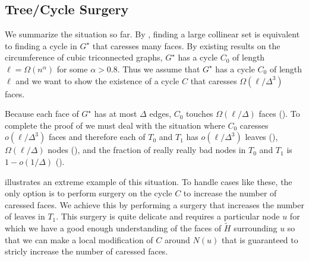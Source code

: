 \documentclass{patmorin}
\newcommand{\dual}[1]{{#1}^\star}
\begin{document}
%


\subsection{Tree/Cycle Surgery}

We summarize the situation so far.  By , finding a large collinear set is equivalent to finding a cycle in $\dual{G}$ that caresses many faces.  By existing results on the circumference of cubic triconnected graphs, $\dual{G}$ has a cycle $C_0$ of length $\ell=\Omega(n^{\alpha})$ for some $\alpha > 0.8$.  Thus we assume that $\dual{G}$ has a cycle $C_0$ of length $\ell$ and we want to show the existence of a cycle $C$ that caresses $\Omega(\ell/\Delta^3)$ faces.

Because each face of $\dual{G}$ has at most $\Delta$ edges, $C_0$ touches $\Omega(\ell/\Delta)$ faces ().  To complete the proof of  we must deal with the situation where $C_0$ caresses $o(\ell/\Delta^3)$ faces and therefore each of $T_0$ and $T_1$ has $o(\ell/\Delta^3)$ leaves (), $\Omega(\ell/\Delta)$ nodes (), and the fraction of really really bad nodes in $T_0$ and $T_1$ is $1-o(1/\Delta)$ ().

 illustrates an extreme example of this situation.  To handle cases like these, the only option is to perform surgery on the cycle $C$ to increase the number of caressed faces.  We achieve this by performing a surgery that increases the number of leaves in $T_1$. This surgery is quite delicate and requires a particular node $u$ for which we have a good enough understanding of the faces of $\tilde{H}$ surrounding $u$ so that we can make a local modification of $C$ around $N(u)$ that is guaranteed to stricly increase the number of caressed faces.
\end{document}
